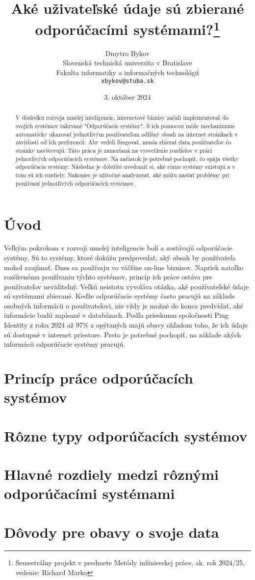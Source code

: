 \documentclass[10pt,twoside,slovak,a4paper]{article}
\title{Aké uživateľské údaje sú zbierané odporúčacími systémami?\thanks{Semestrálny projekt v predmete Metódy inžinierskej práce, ak. rok 2024/25, vedenie: Richard Marko}} %
\author{Dmytro Bykov\\[2pt]
	{\small Slovenská technická univerzita v Bratislave}\\
	{\small Fakulta informatiky a informačných technológií}\\
	{\small \texttt{xbykov@stuba.sk}}
	}
\date{\small 3. október 2024} %
\begin{document}
\maketitle

\begin{abstract}
V dôsledku rozvoja umelej inteligencie, internetové biznisy začali implementovať do svojich systémov takzvané "Odporúčacie systémy". S ich pomocou môže mechanizmus automaticky ukazovať jednotlivým použivateľom odlišný obsah na internet stránkach v závislosti od ich preferencii. Aby vedeli fungovať, musia zbierať data použivateľov čo stránky navštevujú. Táto práca je zamerianá na vysvetlenie rozdielov v práci jednotlivých odporúčacich systémov. Na začiatok je potrebné pochopiť, čo spája všetky odporúčacie systémy. Následne je dôležité uvedomiť si, aké rôzne systémy existujú a v čom sú ich rozdiely. Nakoniec je užitočné analyzovať, aké môžu nastať problémy pri používaní jednotlivých odporúčacích systémov.
\end{abstract}



\section{Úvod}

Veľkým pokrokom v rozvoji umelej inteligencie boli a zostávajú odporúčacie systémy. Sú to systémy, ktoré dokážu predpovedať, aký obsah by používateľa mohol zaujímať. Dnes sa používaju vo väčšine on-line biznisov. Napriek natoľko rozšírenému používaniu týchto systémov, princíp ich práce ostáva pre používateľov neviditeľný. Veľkú neistotu vyvoláva otázka, aké používateľské údaje sú systémami zbierané. Keďže odporúčacie systémy často pracujú na základe osobných informácii o použivateľovi, nie vždy je možné do konca predvídať, aké informácie budú zapísané v databázach. Podľa prieskumu spoločnosti Ping Identity z roku 2024 až 97\% z opýtaných majú obavy ohľadom toho, že ich údaje sú dostupné v internet priestore\cite{Ping:Fear}. Preto je potrebné pochopiť, na základe akých informácii odporúčacie systémy pracujú. 

\section{Princíp práce odporúčacích systémov}

\section{Rôzne typy odporúčacích systémov}

\section{Hlavné rozdiely medzi rôznými odporúčacími systémami}

\section{Dôvody pre obavy o svoje data}


\end{document}
